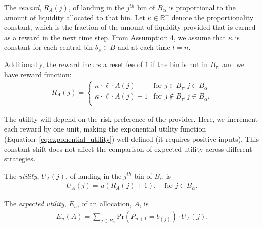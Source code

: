 \documentclass[sigconf, usenames, dvipsnames]{acmart}
\newcommand*{\util}{U_A}
\newcommand*{\reward}{R_A}
\begin{document}
\begin{definition}
The \textit{reward}, $\reward(j)$, of landing in the $j^{th}$ bin of $B_{\alpha}$ is proportional to the amount of liquidity allocated to that bin. Let $\kappa \in \mathbb{R}^+$ denote the proportionality constant, which is the fraction of the amount of liquidity provided that is earned as a reward in the next time step. From Assumption 4, we assume that $\kappa$ is constant for each central bin $b_s \in B$ and at each time $t=n$.

Additionally, the reward incurs a reset fee of $1$ if the bin is not in $B_{\tau}$, and we have reward function: 
\begin{align}
    \reward(j) =
    \begin{cases}
        \kappa \cdot \ell \cdot A(j) & \text{for } j \in B_{\tau}, j \in B_{\alpha} \\
        \kappa \cdot \ell \cdot A(j) - 1 & \text{for } j \notin B_{\tau}, j \in B_{\alpha}. \\
    \end{cases}
\end{align}
\end{definition}

The utility will depend on the risk preference of the provider. Here,  we increment each reward by one unit, making the  exponential utility function (Equation~\ref{eq:exponential_utility}) well defined (it requires positive inputs). This constant shift does not affect the comparison
of expected utility across different strategies.
%
\begin{definition}
The \textit{utility}, $\util(j)$, of landing in the $j^{th}$ bin of $B_{\alpha}$ is
\begin{align}
    \util(j) = u\left(\reward(j)+1\right), \quad \text{for } j \in B_{\alpha}.
\end{align}
\end{definition}

\begin{definition}
The \textit{expected utility}, $E_u$, of an allocation, $A$, is
\begin{align}\label{eq:expected_utility}
    E_u(A) = \sum_{j \in B_{\alpha}}\mathrm{Pr}\left(P_{n+1} = b_{(j)}\right) \cdot \util(j).
\end{align}
\end{definition}
\end{document}
